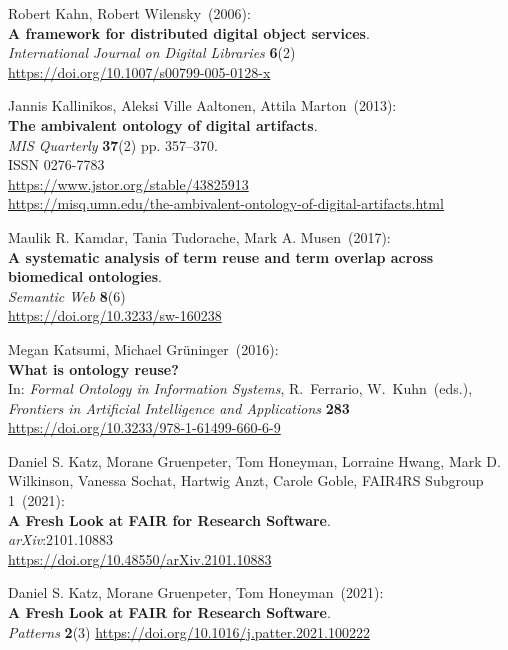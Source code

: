 \begin{thebibliography}{9}
Robert Kahn, Robert Wilensky~(2006): \\
\textbf{A framework for distributed digital object services}.\\
\emph{International Journal on Digital Libraries} \textbf{6}(2)\\
\url{https://doi.org/10.1007/s00799-005-0128-x}

Jannis Kallinikos, Aleksi Ville Aaltonen, Attila Marton~(2013): \\
\textbf{The ambivalent ontology of digital artifacts}.\\ 
\emph{MIS Quarterly} \textbf{37}(2) pp. 357--370.\\
ISSN 0276-7783\\
\url{https://www.jstor.org/stable/43825913}\\
\url{https://misq.umn.edu/the-ambivalent-ontology-of-digital-artifacts.html}

Maulik R. Kamdar, Tania Tudorache, Mark A. Musen~(2017): \\
\textbf{A systematic analysis of term reuse and term overlap across biomedical ontologies}. \\
\emph{Semantic Web} \textbf{8}(6) \\
\url{https://doi.org/10.3233/sw-160238}

Megan Katsumi, Michael Grüninger~(2016): \\
\textbf{What is ontology reuse?}\\
In: \emph{Formal Ontology in Information Systems}, R.~Ferrario, 
W.~Kuhn~(eds.),\\
\emph{Frontiers in Artificial Intelligence and Applications}
\textbf{283}\\
\url{https://doi.org/10.3233/978-1-61499-660-6-9}

Daniel S. Katz, Morane Gruenpeter, Tom Honeyman, Lorraine Hwang,
Mark D. Wilkinson, Vanessa Sochat, Hartwig Anzt, Carole Goble, FAIR4RS
Subgroup 1~(2021): \\
\textbf{A Fresh Look at FAIR for Research Software}.\\
\emph{arXiv}:2101.10883\\
\url{https://doi.org/10.48550/arXiv.2101.10883}

Daniel S. Katz, Morane Gruenpeter, Tom Honeyman~(2021): \\
\textbf{A Fresh Look at FAIR for Research Software}.\\
\emph{Patterns} \textbf{2}(3)
\url{https://doi.org/10.1016/j.patter.2021.100222}


\end{thebibliography}

